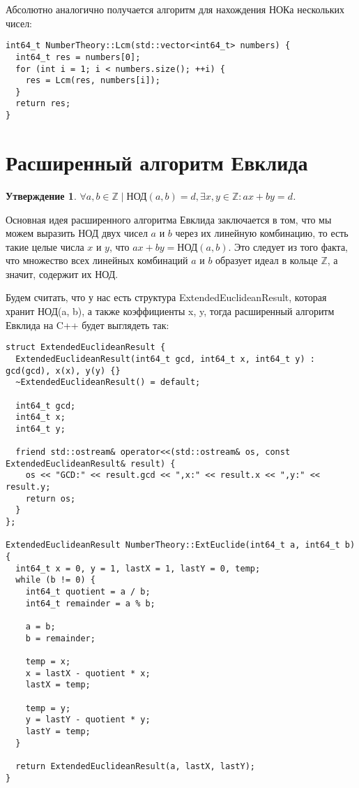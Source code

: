 \documentclass[12pt, a4paper, openany]{book}
\newtheorem*{statement}{Утверждение}
\begin{document}
\noindent
Абсолютно аналогично получается алгоритм для нахождения НОКа нескольких чисел:

\begin{lstlisting}
int64_t NumberTheory::Lcm(std::vector<int64_t> numbers) {
  int64_t res = numbers[0];
  for (int i = 1; i < numbers.size(); ++i) {
    res = Lcm(res, numbers[i]);
  }
  return res;
}
\end{lstlisting}

\section{Расширенный алгоритм Евклида}

\begin{statement}
$\forall a, b \in \mathbb{Z} \mid \text{НОД}(a, b) = d, \exists x, y \in \mathbb{Z}: ax + by = d$.
\end{statement}

Основная идея расширенного алгоритма Евклида заключается в том, что мы можем выразить НОД двух чисел $a$ и $b$ через их линейную комбинацию, то есть такие целые числа $x$ и $y$, что $ax + by = \text{НОД}(a, b)$. Это следует из того факта, что множество всех линейных комбинаций $a$ и $b$ образует идеал в кольце $\mathbb{Z}$, а значит, содержит их НОД.

Будем считать, что у нас есть структура ExtendedEuclideanResult, которая хранит НОД(a, b), а также коэффициенты x, y, тогда расширенный алгоритм Евклида на C++ будет выглядеть так:

\newpage
\begin{lstlisting}[breaklines=true]
struct ExtendedEuclideanResult {
  ExtendedEuclideanResult(int64_t gcd, int64_t x, int64_t y) : gcd(gcd), x(x), y(y) {}
  ~ExtendedEuclideanResult() = default;

  int64_t gcd;
  int64_t x;
  int64_t y;

  friend std::ostream& operator<<(std::ostream& os, const ExtendedEuclideanResult& result) {
    os << "GCD:" << result.gcd << ",x:" << result.x << ",y:" << result.y;
    return os;
  }
};

ExtendedEuclideanResult NumberTheory::ExtEuclide(int64_t a, int64_t b) {
  int64_t x = 0, y = 1, lastX = 1, lastY = 0, temp;
  while (b != 0) {
    int64_t quotient = a / b;
    int64_t remainder = a % b;

    a = b;
    b = remainder;

    temp = x;
    x = lastX - quotient * x;
    lastX = temp;

    temp = y;
    y = lastY - quotient * y;
    lastY = temp;
  }

  return ExtendedEuclideanResult(a, lastX, lastY);
}
\end{lstlisting}
\end{document}
